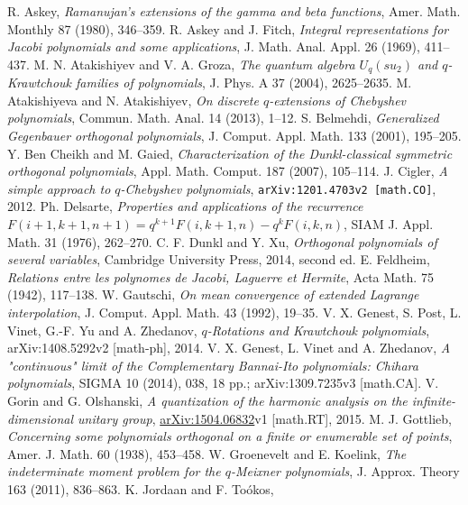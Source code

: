 \documentclass[twoside,11pt]{article}
\begin{document}
\begin{thebibliography}{999}
\label{sec_ref3}
%
%
R. Askey,
{\em Ramanujan's extensions of the gamma and beta functions},
Amer. Math. Monthly 87 (1980), 346--359.
%
R. Askey and J. Fitch,
{\em Integral representations for Jacobi polynomials and some applications},
J. Math. Anal. Appl. 26 (1969), 411--437.
%
M. N. Atakishiyev and V. A. Groza,
{\em The quantum algebra $U_q(su_2)$ and $q$-Krawtchouk families of
polynomials},
J. Phys. A 37 (2004), 2625--2635.
%
M. Atakishiyeva and N. Atakishiyev,
{\em On discrete $q$-extensions of Chebyshev polynomials},
Commun. Math. Anal. 14 (2013),  1--12.
%
S. Belmehdi,
{\em Generalized Gegenbauer orthogonal polynomials},
J. Comput. Appl. Math. 133 (2001), 195--205.
%
Y. Ben Cheikh and M. Gaied,
{\em Characterization of the Dunkl-classical symmetric orthogonal polynomials},
Appl. Math. Comput. 187 (2007), 105--114.
%
J. Cigler,
{\em A simple approach to $q$-Chebyshev polynomials},
{\tt arXiv:1201.4703v2 [math.CO]}, 2012.
%
Ph. Delsarte,
{\em Properties and applications of the recurrence
$F(i+1,k+1,n+1)=q^{k+1}F(i,k+1,n)-q^{k}F(i,k,n)$},
SIAM J. Appl. Math. 31 (1976), 262--270.
%
C. F. Dunkl and Y. Xu,
{\em Orthogonal polynomials of several variables},
Cambridge University Press, 2014, second ed.
%
E. Feldheim,
{\em Relations entre les polynomes de Jacobi, Laguerre et Hermite},
Acta Math. 75 (1942), 117--138.
%
W. Gautschi,
{\em On mean convergence of extended Lagrange interpolation},
J. Comput. Appl. Math. 43 (1992), 19--35.
%
V. X. Genest, S. Post, L. Vinet, G.-F. Yu and A. Zhedanov,
{\em $q$-Rotations and Krawtchouk polynomials},
arXiv:1408.5292v2 [math-ph], 2014.
%
V. X. Genest, L. Vinet and A. Zhedanov,
{\em A "continuous" limit of the Complementary Bannai-Ito polynomials:
Chihara polynomials},
SIGMA 10 (2014), 038, 18 pp.; arXiv:1309.7235v3 [math.CA].
%
V. Gorin and G. Olshanski,
{\em A quantization of the harmonic analysis on the infinite-dimensional
unitary group},
\href{http://arxiv.org/abs/1504.06832}{arXiv:1504.06832}v1 [math.RT], 2015.
%
M. J. Gottlieb,
{\em Concerning some polynomials orthogonal on a finite or enumerable set of  points},
Amer. J. Math. 60 (1938), 453--458.
%
W. Groenevelt and E. Koelink,
{\em The indeterminate moment problem for the $q$-Meixner polynomials},
J. Approx. Theory 163 (2011), 836--863.
%
K. Jordaan and F. To\'okos,

\end{thebibliography}
\end{document}
